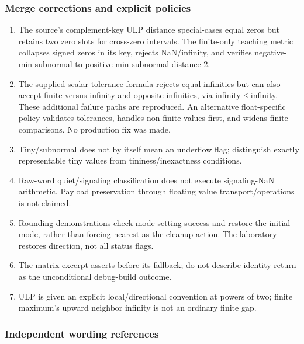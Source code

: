 \subsubsection{Merge corrections and explicit policies}\label{appendix-a103e7846d21-merge-corrections-and-explicit-policies}

\hypertarget{appendix-a103e7846d21-merge-corrections-and-explicit-policies}{}

\begin{enumerate}
\def\labelenumi{\arabic{enumi}.}
\tightlist
\item
  The source's complement-key ULP distance special-cases equal zeros but retains two zero slots for cross-zero intervals. The finite-only teaching metric collapses signed zeros in its key, rejects NaN/infinity, and verifies negative-min-subnormal to positive-min-subnormal distance 2.
\item
  The supplied scalar tolerance formula rejects equal infinities but can also accept finite-versus-infinity and opposite infinities, via infinity ≤ infinity. These additional failure paths are reproduced. An alternative float-specific policy validates tolerances, handles non-finite values first, and widens finite comparisons. No production fix was made.
\item
  Tiny/subnormal does not by itself mean an underflow flag; distinguish exactly representable tiny values from tininess/inexactness conditions.
\item
  Raw-word quiet/signaling classification does not execute signaling-NaN arithmetic. Payload preservation through floating value transport/operations is not claimed.
\item
  Rounding demonstrations check mode-setting success and restore the initial mode, rather than forcing nearest as the cleanup action. The laboratory restores direction, not all status flags.
\item
  The matrix excerpt asserts before its fallback; do not describe identity return as the unconditional debug-build outcome.
\item
  ULP is given an explicit local/directional convention at powers of two; finite maximum's upward neighbor infinity is not an ordinary finite gap.
\end{enumerate}

\subsubsection{Independent wording references}\label{appendix-a103e7846d21-independent-wording-references}


